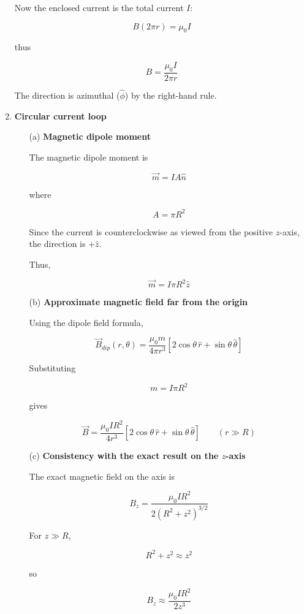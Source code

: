 \documentclass[12pt]{article}
\begin{document}
\begin{enumerate}
Now the enclosed current is the total current \(I\):

\[
B(2\pi r)=\mu_0 I
\]

thus

\[
\boxed{
B=\frac{\mu_0 I}{2\pi r}
}
\]

The direction is azimuthal (\(\hat{\phi}\)) by the right-hand rule.

\vspace{0.5cm}

\item \textbf{Circular current loop}

\begin{itemize}

\item[(a)] \textbf{Magnetic dipole moment}

The magnetic dipole moment is

\[
\vec m=I A \hat n
\]

where

\[
A=\pi R^2
\]

Since the current is counterclockwise as viewed from the positive \(z\)-axis, the direction is \(+\hat z\).

Thus,

\[
\boxed{
\vec m=I\pi R^2\hat z
}
\]

\item[(b)] \textbf{Approximate magnetic field far from the origin}

Using the dipole field formula,

\[
\vec{B}_{dip}(r,\theta)
=
\frac{\mu_0 m}{4\pi r^3}
\left[
2\cos\theta\,\hat r
+
\sin\theta\,\hat\theta
\right]
\]

Substituting

\[
m=I\pi R^2
\]

gives

\[
\boxed{
\vec B
=
\frac{\mu_0 I R^2}{4r^3}
\left[
2\cos\theta\,\hat r
+
\sin\theta\,\hat\theta
\right]
}
\qquad (r\gg R)
\]

\item[(c)] \textbf{Consistency with the exact result on the \(z\)-axis}

The exact magnetic field on the axis is

\[
B_z
=
\frac{\mu_0 I R^2}
{2(R^2+z^2)^{3/2}}
\]

For \(z\gg R\),

\[
R^2+z^2\approx z^2
\]

so

\[
B_z
\approx
\frac{\mu_0 I R^2}{2z^3}
\]


\end{itemize}
\end{enumerate}
\end{document}
